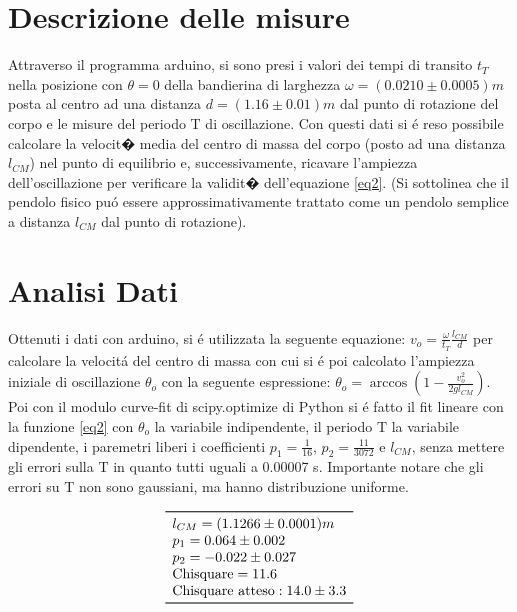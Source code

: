 \documentclass{article}
\begin{document}
\section{Descrizione delle misure}
Attraverso il programma arduino, si sono presi i valori dei tempi di transito $t_T$ nella posizione con $\theta=0$ della bandierina di larghezza $\omega=(0.0210\pm 0.0005)m$ posta al centro ad una distanza $d=(1.16\pm0.01)m$ dal punto di rotazione del corpo e le misure del periodo T di oscillazione. Con questi dati si \'e reso possibile calcolare la velocit� media del centro di massa del corpo (posto ad una distanza $l_{CM}$) nel punto di equilibrio e, successivamente, ricavare l'ampiezza dell'oscillazione per verificare la validit� dell'equazione \eqref{eq2}. 
(Si sottolinea che il pendolo fisico pu\'o essere approssimativamente trattato come un pendolo semplice a distanza $l_{CM}$ dal punto di rotazione).

\section{Analisi Dati}
Ottenuti i dati con arduino, si \'e utilizzata la seguente equazione: $v_{o}=\frac{\omega}{t_T}\frac{l_{CM}}{d}$ per calcolare la velocit\'a del centro di massa con cui si \'e poi calcolato l'ampiezza iniziale di oscillazione $\theta_o$ con la seguente espressione: $\theta_o=\arccos(1-\frac{v_o^2}{2gl_{CM}}) $. Poi con il modulo curve-fit di  scipy.optimize di Python si \'e fatto il fit lineare con la funzione \eqref{eq2} con $\theta_o$ la variabile indipendente, il periodo T la variabile dipendente, i paremetri liberi i coefficienti  $p_1=\frac{1}{16}$, $p_2=\frac{11}{3072}$ e $l_{CM}$, senza mettere gli errori sulla T in quanto tutti uguali a 0.00007 s. Importante notare che gli errori su T non sono gaussiani, ma hanno distribuzione uniforme.

\begin{table}[!htb]
\caption{Risultato del fit lineare con curve-fit}
\label{arr1}
\centering
\[
\begin{array}{l}
\toprule
l_{CM} = (1.1266 \pm 0.0001)m \\
p_1 = 0.064 \pm 0.002  \\
p_2 = -0.022 \pm 0.027  \\
\text{Chisquare} = 11.6       \\
\text{Chisquare atteso}: 14.0 \pm 3.3  \\
\bottomrule
\end{array}
\]
\end{table}
\end{document}
